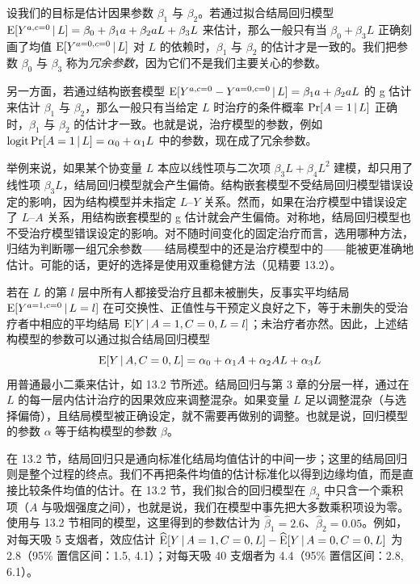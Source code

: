 \begin{finepoint}[冗余参数]
设我们的目标是估计因果参数 $\beta_1$ 与 $\beta_2$。若通过拟合结局回归模型 $\mathrm{E}[Y^{a,c=0}\,|\, L]=\beta_0+\beta_1a+\beta_2aL+\beta_3L$ 来估计，那么一般只有当 $\beta_0+\beta_3L$ 正确刻画了均值 $\mathrm{E}[Y^{a=0,c=0}\,|\, L]$ 对 $L$ 的依赖时，$\beta_1$ 与 $\beta_2$ 的估计才是一致的。我们把参数 $\beta_0$ 与 $\beta_3$ 称为\emph{冗余参数}，因为它们不是我们主要关心的参数。

另一方面，若通过结构嵌套模型 $\mathrm{E}[Y^{a,c=0}-Y^{a=0,c=0}\,|\, L]=\beta_1a+\beta_2aL$ 的 g 估计来估计 $\beta_1$ 与 $\beta_2$，那么一般只有当给定 $L$ 时治疗的条件概率 $\Pr[A=1\,|\, L]$ 正确时，$\beta_1$ 与 $\beta_2$ 的估计才一致。也就是说，治疗模型的参数，例如 $\operatorname{logit}\Pr[A=1\,|\, L]=\alpha_0+\alpha_1L$ 中的参数，现在成了冗余参数。

举例来说，如果某个协变量 $L$ 本应以线性项与二次项 $\beta_3L+\beta_4L^2$ 建模，却只用了线性项 $\beta_3L$，结局回归模型就会产生偏倚。结构嵌套模型不受结局回归模型错误设定的影响，因为结构模型并未指定 $L$–$Y$ 关系。然而，如果在治疗模型中错误设定了 $L$–$A$ 关系，用结构嵌套模型的 g 估计就会产生偏倚。对称地，结局回归模型也不受治疗模型错误设定的影响。对不随时间变化的固定治疗而言，选用哪种方法，归结为判断哪一组冗余参数——结局模型中的还是治疗模型中的——能被更准确地估计。可能的话，更好的选择是使用双重稳健方法（见精要 13.2）。
\end{finepoint}

若在 $L$ 的第 $l$ 层中所有人都接受治疗且都未被删失，反事实平均结局 $\mathrm{E}[Y^{a=1,c=0}\,|\, L=l]$ 在可交换性、正值性与干预定义良好之下，等于未删失的受治疗者中相应的平均结局 $\mathrm{E}[Y\,|\, A=1,C=0,L=l]$；未治疗者亦然。因此，上述结构模型的参数可以通过拟合结局回归模型
\[
\mathrm{E}[Y\,|\, A,C=0,L]=\alpha_0+\alpha_1A+\alpha_2AL+\alpha_3L
\]
用普通最小二乘来估计，如 13.2 节所述。结局回归与第 3 章的分层一样，通过在 $L$ 的每一层内估计治疗的因果效应来调整混杂。如果变量 $L$ 足以调整混杂（与选择偏倚），且结局模型被正确设定，就不需要再做别的调整。也就是说，回归模型的参数 $\alpha$ 等于结构模型的参数 $\beta$。

在 13.2 节，结局回归只是通向标准化结局均值估计的中间一步；这里的结局回归则是整个过程的终点。我们不再把条件均值的估计标准化以得到边缘均值，而是直接比较条件均值的估计。在 13.2 节，我们拟合的回归模型在 $\beta_2$ 中只含一个乘积项（$A$ 与吸烟强度之间），也就是说，我们在模型中事先把大多数乘积项设为零。使用与 13.2 节相同的模型，这里得到的参数估计为 $\hat\beta_1=2.6$、$\hat\beta_2=0.05$。例如，对每天吸 5 支烟者，效应估计 $\widehat{\mathrm{E}}[Y\,|\, A=1,C=0,L]-\widehat{\mathrm{E}}[Y\,|\, A=0,C=0,L]$ 为 2.8（95\% 置信区间：1.5, 4.1）；对每天吸 40 支烟者为 4.4（95\% 置信区间：2.8, 6.1）。

